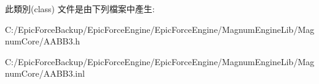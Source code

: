 此類別(class) 文件是由下列檔案中產生\+:\begin{DoxyCompactItemize}
\item 
C\+:/\+Epic\+Force\+Backup/\+Epic\+Force\+Engine/\+Epic\+Force\+Engine/\+Magnum\+Engine\+Lib/\+Magnum\+Core/A\+A\+B\+B3.\+h\item 
C\+:/\+Epic\+Force\+Backup/\+Epic\+Force\+Engine/\+Epic\+Force\+Engine/\+Magnum\+Engine\+Lib/\+Magnum\+Core/A\+A\+B\+B3.\+inl\end{DoxyCompactItemize}
